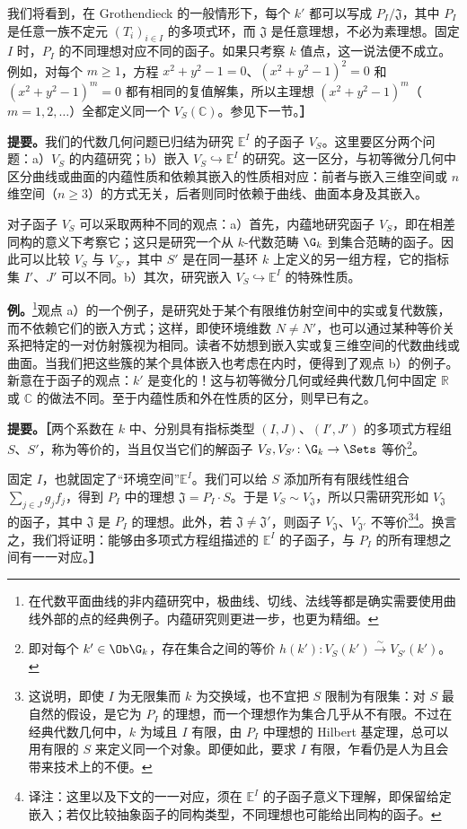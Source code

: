 我们将看到，在 Grothendieck 的一般情形下，每个 $k'$ 都可以写成 $P_I/\mathfrak J$，其中 $P_I$ 是任意一族不定元 $(T_i)_{i\in I}$ 的多项式环，而 $\mathfrak J$ 是任意理想，不必为素理想。固定 $I$ 时，$P_I$ 的不同理想对应不同的函子。如果只考察 $k$ 值点，这一说法便不成立。例如，对每个 $m\geq1$，方程 $x^2+y^2-1=0$、$(x^2+y^2-1)^2=0$ 和 $(x^2+y^2-1)^m=0$ 都有相同的复值解集，所以主理想 $(x^2+y^2-1)^m$（$m=1,2,\ldots$）全都定义同一个 $V_S(\mathbb C)$。参见下一节。\textbf{］}

\textbf{提要。}我们的代数几何问题已归结为研究 $\mathbb E^I$ 的子函子 $V_S$。这里要区分两个问题：a）$V_S$ 的内蕴研究；b）嵌入 $V_S\hookrightarrow\mathbb E^I$ 的研究。这一区分，与初等微分几何中区分曲线或曲面的内蕴性质和依赖其嵌入的性质相对应：前者与嵌入三维空间或 $n$ 维空间（$n\geq3$）的方式无关，后者则同时依赖于曲线、曲面本身及其嵌入。

对子函子 $V_S$ 可以采取两种不同的观点：a）首先，内蕴地研究函子 $V_S$，即在相差同构的意义下考察它；这只是研究一个从 $k$-代数范畴 $\G_k$ 到集合范畴的函子。因此可以比较 $V_S$ 与 $V_{S'}$，其中 $S'$ 是在同一基环 $k$ 上定义的另一组方程，它的指标集 $I'$、$J'$ 可以不同。b）其次，研究嵌入 $V_S\hookrightarrow\mathbb E^I$ 的特殊性质。

\textbf{例。}\footnote{在代数平面曲线的非内蕴研究中，极曲线、切线、法线等都是确实需要使用曲线外部的点的经典例子。内蕴研究则更进一步，也更为精细。}观点 a）的一个例子，是研究处于某个有限维仿射空间中的实或复代数簇，而不依赖它们的嵌入方式；这样，即使环境维数 $N\ne N'$，也可以通过某种等价关系把特定的一对仿射簇视为相同。读者不妨想到嵌入实或复三维空间的代数曲线或曲面。当我们把这些簇的某个具体嵌入也考虑在内时，便得到了观点 b）的例子。
新意在于函子的观点：$k'$ 是变化的！这与初等微分几何或经典代数几何中固定 $\mathbb R$ 或 $\mathbb C$ 的做法不同。至于内蕴性质和外在性质的区分，则早已有之。

\textbf{提要。［}两个系数在 $k$ 中、分别具有指标类型 $(I,J)$、$(I',J')$ 的多项式方程组 $S$、$S'$，称为等价的，当且仅当它们的解函子 $V_S,V_{S'}\colon\G_k\to\Sets$ 等价\footnote{即对每个 $k'\in\Ob\G_k$，存在集合之间的等价 $h(k')\colon V_S(k')\xrightarrow{\sim}V_{S'}(k')$。}。

固定 $I$，也就固定了“环境空间”$\mathbb E^I$。我们可以给 $S$ 添加所有有限线性组合 $\sum_{j\in J}g_jf_j$，得到 $P_I$ 中的理想 $\mathfrak J=P_I\cdot S$。于是 $V_S\sim V_{\mathfrak J}$，所以只需研究形如 $V_{\mathfrak J}$ 的函子，其中 $\mathfrak J$ 是 $P_I$ 的理想。此外，若 $\mathfrak J\ne\mathfrak J'$，则函子 $V_{\mathfrak J}$、$V_{\mathfrak J'}$ 不等价\footnote{这说明，即使 $I$ 为无限集而 $k$ 为交换域，也不宜把 $S$ 限制为有限集：对 $S$ 最自然的假设，是它为 $P_I$ 的理想，而一个理想作为集合几乎从不有限。不过在经典代数几何中，$k$ 为域且 $I$ 有限，由 $P_I$ 中理想的 Hilbert 基定理，总可以用有限的 $S$ 来定义同一个对象。即便如此，要求 $I$ 有限，乍看仍是人为且会带来技术上的不便。}\footnote{译注：这里以及下文的一一对应，须在 $\mathbb E^I$ 的子函子意义下理解，即保留给定嵌入；若仅比较抽象函子的同构类型，不同理想也可能给出同构的函子。}。换言之，我们将证明：能够由多项式方程组描述的 $\mathbb E^I$ 的子函子，与 $P_I$ 的所有理想之间有一一对应。\textbf{］}

